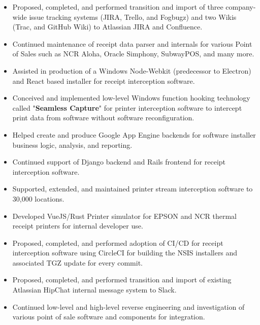 \documentclass[10pt,letter,ragged2e]{altacv}
\begin{document}
\begin{paracol}{2}
\begin{itemize}
\item Proposed, completed, and performed transition and import of three company-wide issue tracking systems (JIRA, Trello, and Fogbugz) and two Wikis (Trac, and GitHub Wiki) to Atlassian JIRA and Confluence.
\item Continued maintenance of receipt data parser and internals for various Point of Sales such as NCR Aloha, Oracle Simphony, SubwayPOS, and many more.
\item Assisted in production of a Windows Node-Webkit (predecessor to Electron) and React based installer for receipt interception software.
\item Conceived and implemented low-level Windows function hooking technology called "\textbf{Seamless Capture}" for printer interception software to intercept print data from software without software reconfiguration.
\item Helped create and produce Google App Engine backends for software installer business logic, analysis, and reporting.
\item Continued support of Django backend and Rails frontend for receipt interception software.
\item Supported, extended, and maintained printer stream interception software to 30,000 locations.
\item Developed VueJS/Rust Printer simulator for EPSON and NCR thermal receipt printers for internal developer use.
\item Proposed, completed, and performed adoption of CI/CD for receipt interception software using CircleCI for building the NSIS installers and associated TGZ update for every commit.
\item Proposed, completed, and performed transition and import of existing Atlassian HipChat internal message system to Slack.
\item Continued low-level and high-level reverse engineering and investigation of various point of sale software and components for integration.
\end{itemize}

\divider


\end{paracol}
\end{document}
